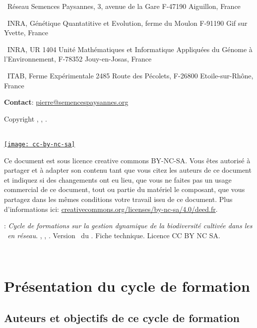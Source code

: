 \small
\noindent{}~Réseau Semences Paysannes, 3, avenue de la Gare F-47190 Aiguillon, France 

\noindent{}~INRA, Génétique Quantatitive et Evolution, ferme du Moulon F-91190 Gif sur Yvette, France

\noindent{}~INRA, UR 1404 Unité Mathématiques et Informatique Appliquées du Génome à l'Environnement, F-78352 Jouy-en-Josas, France

\noindent{}~ITAB, Ferme Expérimentale 2485 Route des Pécolets, F-26800 Etoile-sur-Rhône, France

\noindent\up{*} \textbf{Contact}: \href{mailto:pierre@semencespaysannes.org}{\textcolor{mln-green} {pierre@semencespaysannes.org}}

\normalsize

\vfill

\begin{center}
Copyright \RSP, \INRA, \ITAB.

~\\

\href{http://creativecommons.org/licenses/by-nc-sa/4.0/deed.fr}{\texttt{[image: cc-by-nc-sa]}}
\end{center}

\small
Ce document est sous licence creative commons BY-NC-SA.
Vous êtes autorisé à partager et à adapter son contenu tant 
que vous citez les auteurs de ce document et indiquez si des changements ont eu lieu, 
que vous ne faites pas un usage commercial de ce document, tout ou partie du matériel le composant,
que vous partagez dans les mêmes conditions votre travail issu de ce document. 
Plus d'informations ici: \url{creativecommons.org/licenses/by-nc-sa/4.0/deed.fr}.

\vfill

:
\textit{
Cycle de formations sur la gestion dynamique de la biodiversité cultivée dans les
\MSPs~en réseau}.
\RSP, \INRA, \ITAB.
Version \versionCF~du \dateversionCF.
Fiche technique.
Licence CC BY NC SA.


\newpage ~\\ \newpage \tableofcontents \newpage \pagestyle{plain}

\chapter{Présentation du cycle de formation}
\startcontents[chapters]

\section{Auteurs et objectifs de ce cycle de formation}

